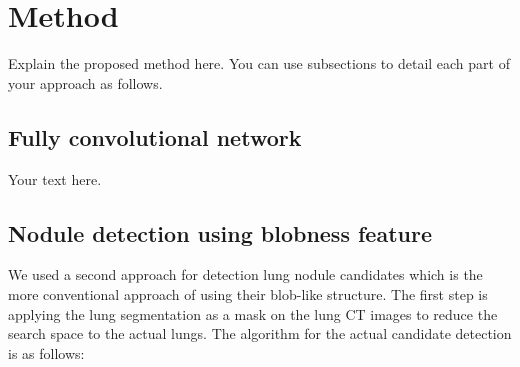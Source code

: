 \documentclass{article}
\begin{document}
\section{Method}\label{sec:method}
Explain the proposed method here.
You can use subsections to detail each part of your approach as follows. 
\subsection{Fully convolutional network}
Your text here.

\subsection{Nodule detection using blobness feature}
We used a second approach for detection lung nodule candidates which is the more conventional approach of using their blob-like structure. The first step is applying the lung segmentation as a mask on the lung CT images to reduce the search space to the actual lungs. The algorithm for the actual candidate detection is as follows:
\end{document}
